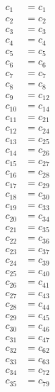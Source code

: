\documentclass{article}
\begin{document}
\begin{align*}
c_{1} &= c_{1} \\
c_{2} &= c_{2} \\
c_{3} &= c_{3} \\
c_{4} &= c_{4} \\
c_{5} &= c_{5} \\
c_{6} &= c_{6} \\
c_{7} &= c_{7} \\
c_{8} &= c_{8} \\
c_{9} &= c_{12} \\
c_{10} &= c_{14} \\
c_{11} &= c_{21} \\
c_{12} &= c_{24} \\
c_{13} &= c_{25} \\
c_{14} &= c_{26} \\
c_{15} &= c_{27} \\
c_{16} &= c_{28} \\
c_{17} &= c_{29} \\
c_{18} &= c_{30} \\
c_{19} &= c_{33} \\
c_{20} &= c_{34} \\
c_{21} &= c_{35} \\
c_{22} &= c_{36} \\
c_{23} &= c_{37} \\
c_{24} &= c_{39} \\
c_{25} &= c_{40} \\
c_{26} &= c_{41} \\
c_{27} &= c_{43} \\
c_{28} &= c_{44} \\
c_{29} &= c_{45} \\
c_{30} &= c_{46} \\
c_{31} &= c_{47} \\
c_{32} &= c_{62} \\
c_{33} &= c_{63} \\
c_{34} &= c_{72} \\
c_{35} &= c_{79} \\
\end{align*}
\end{document}
